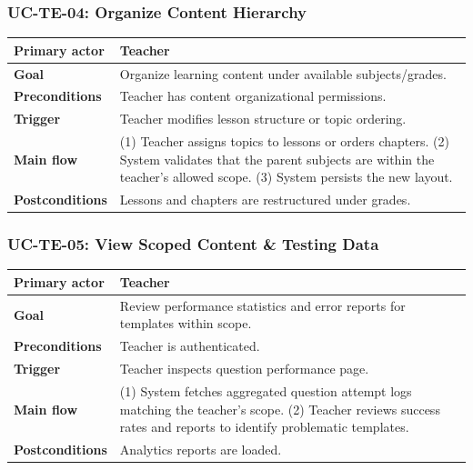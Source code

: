 \subsubsection{UC-TE-04: Organize Content Hierarchy}
\begin{longtable}{L{0.28\textwidth}L{0.62\textwidth}}
\textbf{Primary actor} & Teacher \\ \hline
\textbf{Goal} & Organize learning content under available subjects/grades. \\ \hline
\textbf{Preconditions} & Teacher has content organizational permissions. \\ \hline
\textbf{Trigger} & Teacher modifies lesson structure or topic ordering. \\ \hline
\textbf{Main flow} & (1) Teacher assigns topics to lessons or orders chapters. (2) System validates that the parent subjects are within the teacher's allowed scope. (3) System persists the new layout. \\ \hline
\textbf{Postconditions} & Lessons and chapters are restructured under grades. \\
\end{longtable}

\subsubsection{UC-TE-05: View Scoped Content \& Testing Data}
\begin{longtable}{L{0.28\textwidth}L{0.62\textwidth}}
\textbf{Primary actor} & Teacher \\ \hline
\textbf{Goal} & Review performance statistics and error reports for templates within scope. \\ \hline
\textbf{Preconditions} & Teacher is authenticated. \\ \hline
\textbf{Trigger} & Teacher inspects question performance page. \\ \hline
\textbf{Main flow} & (1) System fetches aggregated question attempt logs matching the teacher's scope. (2) Teacher reviews success rates and reports to identify problematic templates. \\ \hline
\textbf{Postconditions} & Analytics reports are loaded. \\
\end{longtable}

